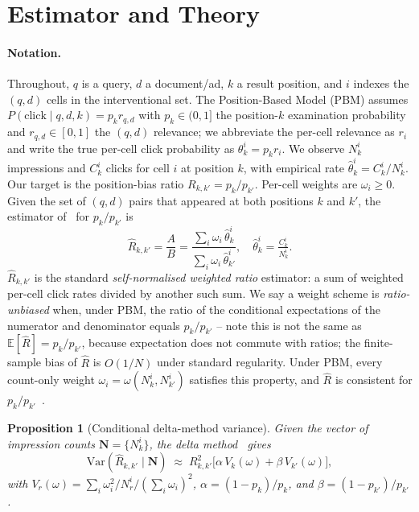 \documentclass[sigconf]{acmart}
\newtheorem{proposition}[theorem]{Proposition}
\begin{document}
\section{Estimator and Theory}
\label{sec:method}

\paragraph{Notation.} Throughout, $q$ is a query, $d$ a document/ad,
$k$ a result position, and $i$ indexes the $(q,d)$ cells in the
interventional set. The Position-Based Model (PBM) assumes
$P(\mathrm{click}\mid q,d,k)=p_kr_{q,d}$ with $p_k\in(0,1]$ the
position-$k$ examination probability and $r_{q,d}\in[0,1]$ the
$(q,d)$ relevance; we abbreviate the per-cell relevance as $r_i$ and
write the true per-cell click probability as $\theta_k^i=p_kr_i$. We
observe $N_k^i$ impressions and $C_k^i$ clicks for cell $i$ at
position $k$, with empirical rate $\hat\theta_k^i=C_k^i/N_k^i$. Our
target is the position-bias ratio $R_{k,k'}=p_k/p_{k'}$. Per-cell
weights are $\omega_i\ge 0$. Given the set of $(q,d)$ pairs that
appeared at both positions $k$ and $k'$, the estimator
of~\cite{agarwal2019estimating} for $p_k/p_{k'}$ is
\begin{equation}
\hat R_{k,k'}=\frac{A}{B}=\frac{\sum_i \omega_i\, \hat\theta_k^i}
                              {\sum_i \omega_i\, \hat\theta_{k'}^i},
\quad \hat\theta_k^i=\tfrac{C_k^i}{N_k^i}.
\label{eq:Rhat}
\end{equation}
$\hat R_{k,k'}$ is the standard \emph{self-normalised weighted ratio}
estimator: a sum of weighted per-cell click rates divided by another
such sum. We say a weight scheme is \emph{ratio-unbiased} when, under
PBM, the ratio of the conditional expectations of the numerator and
denominator equals $p_k/p_{k'}$ -- note this is not the same as
$\mathbb E[\hat R]=p_k/p_{k'}$, because expectation does not commute
with ratios; the finite-sample bias of $\hat R$ is $O(1/N)$ under
standard regularity. Under PBM, every count-only weight
$\omega_i=\omega(N_k^i,N_{k'}^i)$ satisfies this property, and $\hat R$
is consistent for $p_k/p_{k'}$~\cite{agarwal2019estimating}.

\begin{proposition}[Conditional delta-method variance]
\label{prop:delta}
Given the vector of impression counts $\mathbf{N}=\{N_k^i\}$, the delta
method~\cite{vdv1998asymptotic} gives
\[
\mathrm{Var}(\hat R_{k,k'}\mid\mathbf N)\;\approx\;R_{k,k'}^2\bigl[\alpha\,V_k(\omega)+\beta\,V_{k'}(\omega)\bigr],
\]
with $V_r(\omega)=\sum_i\omega_i^2/N_r^i / (\sum_i\omega_i)^2$,
$\alpha=(1-p_k)/p_k$, and $\beta=(1-p_{k'})/p_{k'}$.
\end{proposition}
\end{document}
